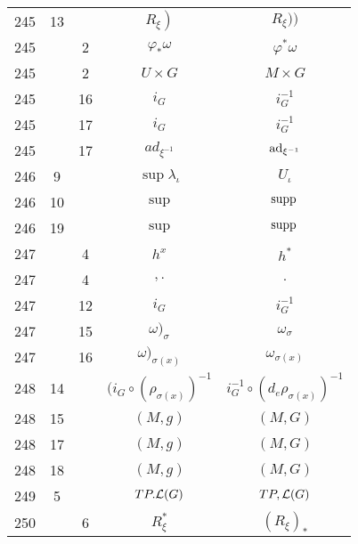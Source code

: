\documentclass[a4paper,11pt]{article}
\begin{document}
\begin{center}
\begin{tabular}{|c|c|c|c|c|}
    245 & 13 & & $\left. R_{ \xi } \right)$ & $ R_{ \xi } ) \big)$ \\
    245 & & \hphantom{0}2 & $\varphi_{ * } \omega$ & $\varphi^{ * } \omega$ \\
    245 & & \hphantom{0}2 & $U \times G$ & $M \times G$ \\
    245 & & 16 & $i_{ G }$ & $i_{ G }^{ -1 }$ \\
    245 & & 17 & $i_{ G }$ & $i_{ G }^{ -1 }$ \\
    245 & & 17 & $ad_{ \xi^{ -1 } }$ & $\mathrm{ad}_{ \xi^{ -1 } }$ \\
    246 & \hphantom{0}9 & & $\sup \lambda_{ \iota }$ & $U_{ \iota }$ \\
    246 & 10 & & $\sup$ & $\mathrm{supp}\,$ \\
    246 & 19 & & $\sup$ & $\mathrm{supp}\,$ \\
    247 & & \hphantom{0}4 & $h^{ x }$ & $h^{ * }$ \\
    247 & & \hphantom{0}4 & $, .$ & $.$ \\
    247 & & 12 & $i_{ G }$ & $i_{ G }^{ -1 }$ \\
    247 & & 15 & $\omega )_{ \sigma }$ & $\omega_{ \sigma }$ \\
    247 & & 16 & $\omega )_{ \sigma( x ) }$ & $\omega_{ \sigma( x ) }$ \\
    248 & 14 & & $( i_{ G } \circ ( \rho_{ \sigma( x ) } )^{ -1 }$
           & $i_{ G }^{ -1 } \circ ( d_{ e }\rho_{ \sigma( x ) } )^{ -1 }$ \\
    248 & 15 & & $( M, g )$ & $( M, G )$ \\
    248 & 17 & & $( M, g )$ & $( M, G )$ \\
    248 & 18 & & $( M, g )$ & $( M, G )$ \\
    249 & \hphantom{0}5 & & $TP.\mathcal{L}( G )$ & $TP, \mathcal{L}( G )$ \\
    250 & & \hphantom{0}6 & $R_{ \xi }^{ * }$ & $( R_{ \xi } )_{ * }$ \\

\end{tabular}
\end{center}
\end{document}
